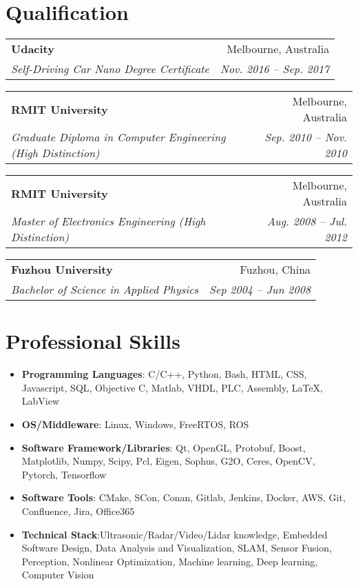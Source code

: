 \documentclass[letterpaper,11pt]{article}
\makeatletter
\newcommand{\resumeItemNoBullet}[4]{
  \vspace{-1pt}
    \begin{tabular*}{0.97\textwidth}{l@{\extracolsep{\fill}}r}
      \textbf{#1} & #2 \\
      \textit{\small#3} & \textit{\small #4} \\
    \end{tabular*}\vspace{-7pt}
}
\newcommand{\resumeSubHeadingListStart}{\begin{itemize}[leftmargin=*]}
\newcommand{\resumeSubHeadingListEnd}{\end{itemize}}
\makeatother
\begin{document}
\section{Qualification}
\resumeItemNoBullet
    {Udacity}{Melbourne, Australia}
    {Self-Driving Car Nano Degree Certificate}{Nov. 2016 -- Sep. 2017}
\vspace{10pt}
\resumeItemNoBullet
    {RMIT University}{Melbourne, Australia}
    {Graduate Diploma in Computer Engineering (High Distinction)}{Sep. 2010 -- Nov. 2010}
\vspace{10pt}
\resumeItemNoBullet
    {RMIT University}{Melbourne, Australia}
    {Master of Electronics Engineering (High Distinction)}{Aug. 2008 -- Jul. 2012}
\vspace{10pt}
\resumeItemNoBullet
    {Fuzhou University}{Fuzhou, China}
    {Bachelor of Science in Applied Physics}{Sep 2004 -- Jun 2008}

\section{Professional Skills}
  \resumeSubHeadingListStart
    \item{
      \textbf{Programming Languages}{: C/C++, Python, Bash, HTML, CSS, Javascript, SQL, Objective C, Matlab, VHDL, PLC, Assembly, \LaTeX, LabView}
	}
    \item{
      \textbf{OS/Middleware}{: Linux, Windows, FreeRTOS, ROS}
  }

    \item{
      \textbf{Software Framework/Libraries}{: Qt, OpenGL, Protobuf, Boost, Matplotlib, Numpy, Scipy, Pcl, Eigen, Sophus, G2O, Ceres, OpenCV, Pytorch, Tensorflow}
  }
    \item{
      \textbf{Software Tools}{: CMake, SCon, Conan, Gitlab, Jenkins, Docker, AWS, Git, Confluence, Jira, Office365}
  }

  \item{
      \textbf{Technical Stack}{:Ultrasonic/Radar/Video/Lidar knowledge, Embedded Software Design, Data Analysis and Visualization, SLAM, Sensor Fusion, Perception, Nonlinear Optimization, Machine learning, Deep learning, Computer Vision}
  }

  \resumeSubHeadingListEnd

\end{document}
